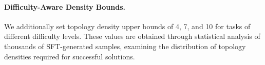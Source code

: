 \documentclass{article}
\theoremstyle{definition}
\newcommand{\siyu}[1]{\textcolor[rgb]{0.8,0.20,0.70}{\textit{#1}}}
\begin{document}

\paragraph{Difficulty-Aware Density Bounds.}
We additionally set topology density upper bounds of 4, 7, and 10 for tasks of different difficulty levels. These values are obtained through statistical analysis of thousands of SFT-generated samples, examining the distribution of topology densities required for successful solutions.



\end{document}
